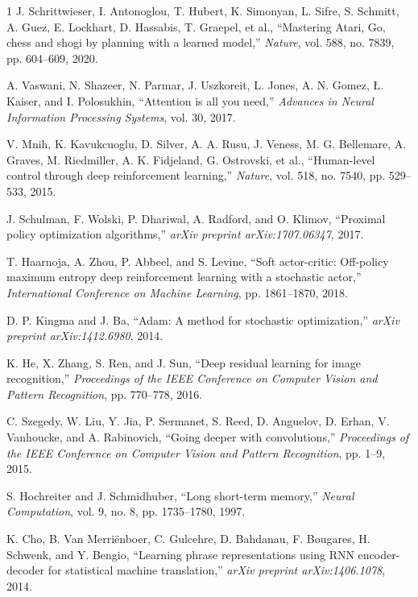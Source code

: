 \documentclass[conference]{IEEEtran}
\begin{document}
\begin{thebibliography}{1}
J. Schrittwieser, I. Antonoglou, T. Hubert, K. Simonyan, L. Sifre, S. Schmitt, A. Guez, E. Lockhart, D. Hassabis, T. Graepel, et al., ``Mastering Atari, Go, chess and shogi by planning with a learned model,'' \textit{Nature}, vol. 588, no. 7839, pp. 604--609, 2020.

A. Vaswani, N. Shazeer, N. Parmar, J. Uszkoreit, L. Jones, A. N. Gomez, Ł. Kaiser, and I. Polosukhin, ``Attention is all you need,'' \textit{Advances in Neural Information Processing Systems}, vol. 30, 2017.

V. Mnih, K. Kavukcuoglu, D. Silver, A. A. Rusu, J. Veness, M. G. Bellemare, A. Graves, M. Riedmiller, A. K. Fidjeland, G. Ostrovski, et al., ``Human-level control through deep reinforcement learning,'' \textit{Nature}, vol. 518, no. 7540, pp. 529--533, 2015.

J. Schulman, F. Wolski, P. Dhariwal, A. Radford, and O. Klimov, ``Proximal policy optimization algorithms,'' \textit{arXiv preprint arXiv:1707.06347}, 2017.

T. Haarnoja, A. Zhou, P. Abbeel, and S. Levine, ``Soft actor-critic: Off-policy maximum entropy deep reinforcement learning with a stochastic actor,'' \textit{International Conference on Machine Learning}, pp. 1861--1870, 2018.

D. P. Kingma and J. Ba, ``Adam: A method for stochastic optimization,'' \textit{arXiv preprint arXiv:1412.6980}, 2014.

K. He, X. Zhang, S. Ren, and J. Sun, ``Deep residual learning for image recognition,'' \textit{Proceedings of the IEEE Conference on Computer Vision and Pattern Recognition}, pp. 770--778, 2016.

C. Szegedy, W. Liu, Y. Jia, P. Sermanet, S. Reed, D. Anguelov, D. Erhan, V. Vanhoucke, and A. Rabinovich, ``Going deeper with convolutions,'' \textit{Proceedings of the IEEE Conference on Computer Vision and Pattern Recognition}, pp. 1--9, 2015.

S. Hochreiter and J. Schmidhuber, ``Long short-term memory,'' \textit{Neural Computation}, vol. 9, no. 8, pp. 1735--1780, 1997.

K. Cho, B. Van Merriënboer, C. Gulcehre, D. Bahdanau, F. Bougares, H. Schwenk, and Y. Bengio, ``Learning phrase representations using RNN encoder-decoder for statistical machine translation,'' \textit{arXiv preprint arXiv:1406.1078}, 2014.


\end{thebibliography}
\end{document}
